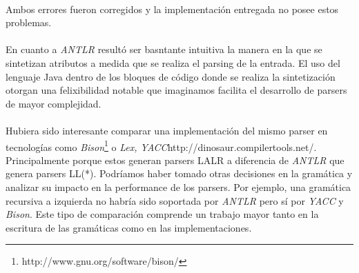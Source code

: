 \paragraph{}Ambos errores fueron corregidos y la implementaci\'on entregada no posee estos problemas.

\paragraph{}En cuanto a \emph{ANTLR} result\'o ser basntante intuitiva la manera en la que se sintetizan atributos a medida que se realiza el parsing de la entrada. El uso del lenguaje Java dentro de los bloques de c\'odigo donde se realiza la sintetizaci\'on otorgan una felixibilidad notable que imaginamos facilita el desarrollo de parsers de mayor complejidad.

\paragraph{}Hubiera sido interesante comparar una implementaci\'on del mismo parser en tecnolog\'ias como \emph{Bison}\footnote{http://www.gnu.org/software/bison/} o \emph{Lex, YACC}\footnotesize{http://dinosaur.compilertools.net/}. Principalmente porque estos generan parsers LALR a diferencia de \emph{ANTLR} que genera parsers LL(*). Podríamos haber tomado otras decisiones en la gram\'atica y analizar su impacto en la performance de los parsers. Por ejemplo, una gram\'atica recursiva a izquierda no habr\'ia sido soportada por \emph{ANTLR} pero s\'i por \emph{YACC} y \emph{Bison}. Este tipo de comparaci\'on comprende un trabajo mayor tanto en la escritura de las gram\'aticas como en las implementaciones.